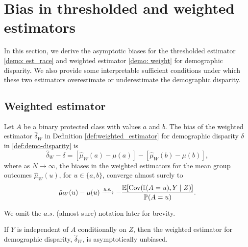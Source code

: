 \section{Bias in thresholded and weighted estimators}
\label{sec:theorems}

In this section, we derive the asymptotic biases for the thresholded estimator \eqref{demo: est_race} and weighted estimator \eqref{demo: weight} for demographic disparity. We also provide some interpretable sufficient conditions under which these two estimators overestimate or underestimate the demographic disparity.



\subsection{Weighted estimator}

\begin{theorem}\label{thm: weighted}
Let $A$ be a binary protected class with values $a$ and $b$. The bias of the weighted estimator $\hat{\delta}_{W}$ in Definition \ref{def:weighted_estimator} for demographic disparity $\delta$ in \eqref{def:demo-disparity} is
\[
\hat{\delta}_{W} - \delta = [\hat{\mu}_{W}(a) - \mu(a)] -  [\hat{\mu}_{W}(b) - \mu(b)],
\]
where as $N \to \infty$, the biases in the weighted estimators for the mean group outcomes $\hat{\mu}_{W}(u)$, for $u\in\{a,b\}$, converge almost surely to
\begin{equation}
\hat{\mu}_{W}(u) - \mu(u) \xrightarrow{\textrm{a.s.}} -\frac{\mathbb{E} [\operatorname{Cov} (\mathbb{I}(A = u), Y \mid Z)]}{\mathbb{P} (A = u)}.\label{formula: weight-bias1}
\end{equation}

\end{theorem}

We omit the $a.s.$ (almost sure) notation later for brevity.

\begin{corollary}
\label{corr:weighted-unbiased}
If $Y$ is independent of $A$ conditionally on $Z$, then the weighted estimator for demographic disparity, $\hat{\delta}_{W}$, is asymptotically unbiased.
\end{corollary}

